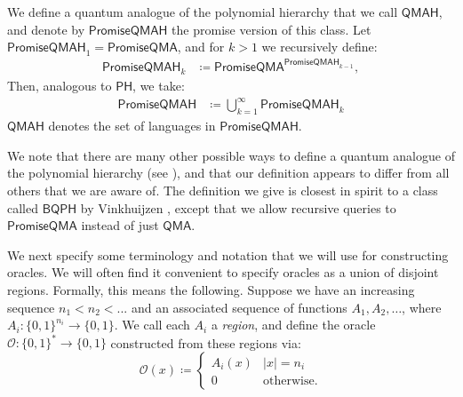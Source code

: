 \documentclass[11pt]{article}%
\newcommand{\Dom}{\mathrm{Dom}}
\begin{document}
We define a quantum analogue of the polynomial hierarchy that we call $\mathsf{QMAH}$, and denote by $\mathsf{PromiseQMAH}$ the promise version of this class. Let $\mathsf{PromiseQMAH}_1 = \mathsf{PromiseQMA}$, and for $k > 1$ we recursively define:
\begin{align*}
\mathsf{PromiseQMAH}_k &\coloneqq \mathsf{PromiseQMA}^{\mathsf{PromiseQMAH}_{k-1}},
\end{align*}
Then, analogous to $\mathsf{PH}$, we take:
\begin{align*}
\mathsf{PromiseQMAH} &\coloneqq \bigcup_{k=1}^\infty \mathsf{PromiseQMAH}_k
\end{align*}
$\mathsf{QMAH}$ denotes the set of languages in $\mathsf{PromiseQMAH}$.

We note that there are many other possible ways to define a quantum analogue of the polynomial hierarchy (see \cite{GSS+18}), and that our definition appears to differ from all others that we are aware of. The definition we give is closest in spirit to a class called $\mathsf{BQPH}$ by Vinkhuijzen \cite{Vin18}, except that we allow recursive queries to $\mathsf{PromiseQMA}$ instead of just $\mathsf{QMA}$.


We next specify some terminology and notation that we will use for constructing oracles. We will often find it convenient to specify oracles as a union of disjoint regions. Formally, this means the following. Suppose we have an increasing sequence $n_1 < n_2 < ...$ and an associated sequence of functions $A_1, A_2, \ldots$, where $A_i: \{0,1\}^{n_i} \to \{0,1\}$. We call each $A_i$ a \textit{region}, and define the oracle $\mathcal{O}: \{0,1\}^* \to \{0,1\}$ constructed from these regions via:
\[
\mathcal{O}(x) \coloneqq \begin{cases}
A_i(x) & |x| = n_i\\
0 & \text{otherwise.}
\end{cases}
\]
\end{document}
